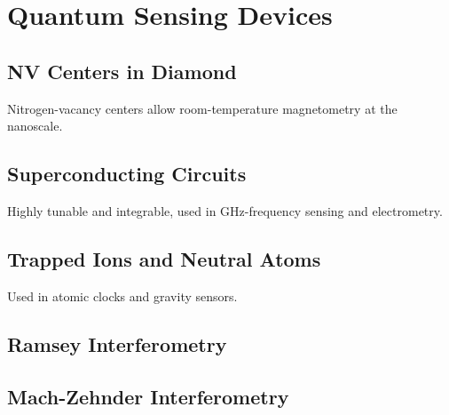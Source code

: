 \chapter{Quantum Sensing Devices}

\section{NV Centers in Diamond}

Nitrogen-vacancy centers allow room-temperature magnetometry at the nanoscale.

\section{Superconducting Circuits}

Highly tunable and integrable, used in GHz-frequency sensing and electrometry.

\section{Trapped Ions and Neutral Atoms}

Used in atomic clocks and gravity sensors.

\section{Ramsey Interferometry}

\section{Mach-Zehnder Interferometry}

